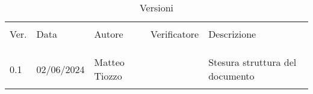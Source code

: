 \documentclass[italian,12pt]{article}
\begin{document}

\newpage


\begin{table}[!h]
    \caption*{Versioni}
    \begin{center}
        \begin{tabular}{l l l l p{6cm}}
            \hline\\[-2ex]
            Ver. & Data       & Autore          & Verificatore        & Descrizione\\\\[-2ex] \hline \\[-1.5ex]\\
            0.1  & 02/06/2024 & Matteo Tiozzo   &	                  & Stesura struttura del documento  \\
            \\[-1.5ex] \hline
        \end{tabular}
    \end{center}
\end{table}

\newpage
\tableofcontents
\newpage
\listoffigures
\newpage




\end{document}
